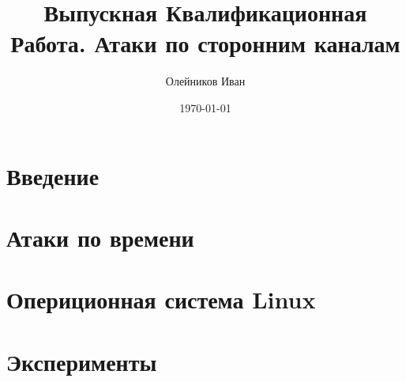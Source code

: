 \documentclass[11pt,twoside,a4paper]{report}
\begin{document}
\title{Выпускная Квалификационная Работа. Атаки по сторонним каналам}
\author{Олейников Иван}
\date{\today}
\maketitle

\tableofcontents



\chapter*{Введение}


\chapter{Атаки по времени}


\chapter{Опериционная система Linux}


\chapter{Эксперименты}



 
\end{document}
